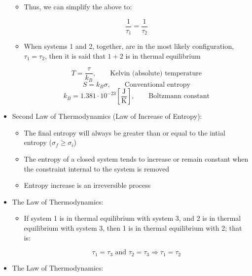 \begin{itemize}
\begin{itemize}
      \item Thus, we can simplify the above to:

        $$\frac{1}{\tau_1}=\frac{1}{\tau_2}$$

      \item When systems 1 and 2, together, are in the most likely configuration, $\tau_1=\tau_2$, then it is said that $1+2$ is in thermal equilibrium

        $$\boxed{T=\frac{\tau}{k_B},\quad\quad\text{Kelvin (absolute) temperature}}$$
        $$\boxed{S=k_B\sigma,\quad\quad\text{Conventional entropy}}$$
        $$\boxed{k_B=1.381\cdot10^{-23}\left[ \frac{\si{\joule}}{\si{\kelvin}} \right],\quad\quad\text{Boltzmann constant}}$$

    \end{itemize}

  \item Second Law of Thermodynamics (Law of Increase of Entropy):

    \begin{itemize}

      \item The final entropy will always be greater than or equal to the intial entropy ($\sigma_f\geq\sigma_i$)

      \item The entropy of a closed system tends to increase or remain constant when the constraint internal to the system is removed

      \item Entropy increase is an irreversible process

    \end{itemize}

  \item The  Law of Thermodynamics:

    \begin{itemize}

      \item If system 1 is in thermal equilibrium with system 3, and 2 is in thermal equilibrium with system 3, then 1 is in thermal equilibrium with 2; that is:

        $$\tau_1=\tau_3\text{ and }\tau_2=\tau_3\Rightarrow \tau_1=\tau_2$$

    \end{itemize}

  \item The  Law of Thermodynamics:

    \begin{itemize}


\end{itemize}
\end{itemize}
